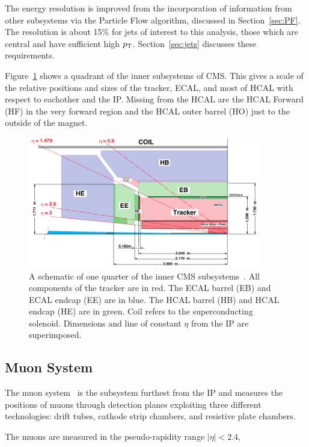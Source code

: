The energy resolution is improved from the incorporation of information from other subsystems via
the Particle Flow algorithm, discussed in Section~\ref{sec:PF}.
The resolution is about 15\% for jets of interest to this analysis, those which are central and
have sufficient high $p_{\rm T}$. Section~\ref{sec:jets} discusses these requirements.

Figure~\ref{fig:subsystems_inner} shows a quadrant of the inner subsystems of CMS. This gives
a scale of the relative positions and sizes of the tracker, ECAL,
and most of HCAL with respect to eachother and the IP. Missing from the HCAL are the 
HCAL Forward (HF) in the very forward region and the HCAL outer barrel (HO) just to the outside of
the magnet.

\begin{figure}[ht]
 \begin{center}
   \includegraphics[width=0.90\textwidth]{figures/experiment/subsystems_inner.pdf}
      \end{center}
\caption{A schematic of one quarter of the inner CMS subsystems~\cite{ecaltdr}.
All components of the tracker are in red. The ECAL barrel (EB) and ECAL endcap (EE) are in blue.
The HCAL barrel (HB) and HCAL endcap (HE) are in green. Coil refers to the superconducting solenoid.
Dimensions and line of constant $\eta$ from the IP are superimposed.}
\label{fig:subsystems_inner}
\end{figure}


\subsection{Muon System\label{subsec:muonsystem}}

The muon system~\cite{muontdr} is the subsystem furthest from the IP and measures the positions
of muons through detection planes exploiting three different technologies:
drift tubes, cathode strip chambers, and resistive plate chambers.




The muons are measured in the pseudo-rapidity range $|\eta|< 2.4$,



